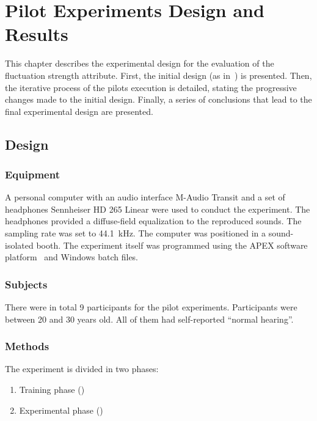 \documentclass[../main.tex]{subfiles}
\begin{document}
\chapter{Pilot Experiments Design and Results}
\label{cha:pilot}

This chapter describes the experimental design for the evaluation of the
fluctuation strength attribute. First, the initial design (as
in~\cite{Fastl1982Fluctuation}) is presented. Then, the iterative process of the
pilots execution is detailed, stating the progressive changes made to the
initial design. Finally, a series of conclusions that lead to the final
experimental design are presented.

\section{Design}

\subsection{Equipment}
\label{subsec:pilot_equipment}

A personal computer with an audio interface M-Audio Transit and a set of
headphones Sennheiser HD 265 Linear were used to conduct the experiment. The
headphones provided a diffuse-field equalization to the reproduced sounds. The
sampling rate was set to 44.1~kHz. The computer was positioned in a
sound-isolated booth. The experiment itself was programmed using the APEX
software platform~\cite{Francart2008} and Windows batch files.

\subsection{Subjects}

There were in total 9 participants for the pilot experiments. Participants were
between 20 and 30 years old. All of them had self-reported ``normal hearing''.

\subsection{Methods}

The experiment is divided in two phases:
\begin{enumerate}
  \item Training phase ()
  \item Experimental phase ()
\end{enumerate}
\end{document}
